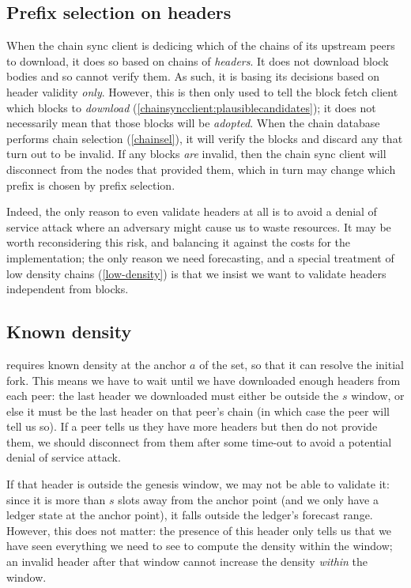 \subsection{Prefix selection on headers}

When the chain sync client is dedicing which of the chains of its upstream peers
to download, it does so based on chains of \emph{headers}. It does not download
block bodies and so cannot verify them. As such, it is basing its decisions
based on header validity \emph{only}.  However, this is then only used to tell
the block fetch client which blocks to \emph{download}
(\cref{chainsyncclient:plausiblecandidates}); it does not necessarily mean that
those blocks will be \emph{adopted}. When the chain database performs chain
selection (\cref{chainsel}), it will verify the blocks and discard any that turn
out to be invalid. If any blocks \emph{are} invalid, then the chain sync client
will disconnect from the nodes that provided them, which in turn may change
which prefix is chosen by prefix selection.

Indeed, the only reason to even validate headers at all is to avoid a denial
of service attack where an adversary might cause us to waste resources.
It may be worth reconsidering this risk, and balancing it against the costs
for the implementation; the only reason we need forecasting, and a special
treatment of low density chains (\cref{low-density}) is that we insist we want
to validate headers independent from blocks.

\pagebreak
\subsection{Known density}

 requires known density at the anchor $a$ of the set, so
that it can resolve the initial fork. This means we have to wait until
we have downloaded enough headers from each peer: the last header we downloaded
must either be outside the $s$ window, or else it must be the last header on that
peer's chain (in which case the peer will tell us so). If a peer tells us they have
more headers but then do not provide them, we should disconnect from them
after some time-out to avoid a potential denial of service attack.

If that header is outside the genesis window, we may not be able to validate it:
since it is more than $s$ slots away from the anchor point (and we only have a
ledger state at the anchor point), it falls outside the ledger's forecast range.
However, this does not matter: the presence of this header only tells us that we
have seen everything we need to see to compute the density within the window; an
invalid header after that window cannot increase the density \emph{within} the
window.

